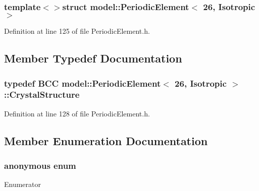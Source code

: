 \subsubsection*{template$<$$>$struct model\+::\+Periodic\+Element$<$ 26, Isotropic $>$}



Definition at line 125 of file Periodic\+Element.\+h.



\subsection{Member Typedef Documentation}
\hypertarget{structmodel_1_1_periodic_element_3_0126_00_01_isotropic_01_4_ae6a20675c49555864c79b6aeb6449772}{}
\subsubsection[{Crystal\+Structure}]{\setlength{\rightskip}{0pt plus 5cm}typedef {\bf B\+C\+C} {\bf model\+::\+Periodic\+Element}$<$ 26, {\bf Isotropic} $>$\+::{\bf Crystal\+Structure}}\label{structmodel_1_1_periodic_element_3_0126_00_01_isotropic_01_4_ae6a20675c49555864c79b6aeb6449772}


Definition at line 128 of file Periodic\+Element.\+h.



\subsection{Member Enumeration Documentation}
\hypertarget{structmodel_1_1_periodic_element_3_0126_00_01_isotropic_01_4_ab94af6d6d1ff024d0f613b3b4d424f42}{}\subsubsection[{anonymous enum}]{\setlength{\rightskip}{0pt plus 5cm}anonymous enum}\label{structmodel_1_1_periodic_element_3_0126_00_01_isotropic_01_4_ab94af6d6d1ff024d0f613b3b4d424f42}
\begin{Desc}
\item[Enumerator]\par
\begin{description}
\item[{\em 
\hypertarget{structmodel_1_1_periodic_element_3_0126_00_01_isotropic_01_4_ab94af6d6d1ff024d0f613b3b4d424f42a10ccaa8ea2449c516c02f08e1abd89b7}{}Z\label{structmodel_1_1_periodic_element_3_0126_00_01_isotropic_01_4_ab94af6d6d1ff024d0f613b3b4d424f42a10ccaa8ea2449c516c02f08e1abd89b7}
}]\end{description}
\end{Desc}


